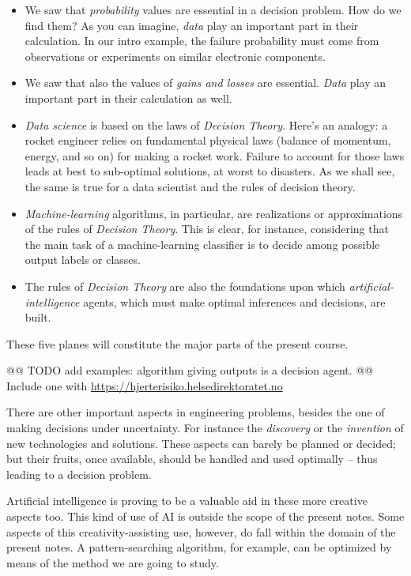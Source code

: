 \documentclass[
  a4paper,
  DIV=11,
  numbers=noendperiod,
  oneside]{scrreprt}
\begin{document}
\begin{itemize}
\item
  We saw that \emph{probability} values are essential in a decision
  problem. How do we find them? As you can imagine, \emph{data} play an
  important part in their calculation. In our intro example, the failure
  probability must come from observations or experiments on similar
  electronic components.
\item
  We saw that also the values of \emph{gains and losses} are essential.
  \emph{Data} play an important part in their calculation as well.
\item
  \emph{Data science} is based on the laws of \emph{Decision Theory}.
  Here's an analogy: a rocket engineer relies on fundamental physical
  laws (balance of momentum, energy, and so on) for making a rocket
  work. Failure to account for those laws leads at best to sub-optimal
  solutions, at worst to disasters. As we shall see, the same is true
  for a data scientist and the rules of decision theory.
\item
  \emph{Machine-learning} algorithms, in particular, are realizations or
  approximations of the rules of \emph{Decision Theory}. This is clear,
  for instance, considering that the main task of a machine-learning
  classifier is to decide among possible output labels or classes.
\item
  The rules of \emph{Decision Theory} are also the foundations upon
  which \emph{artificial-intelligence} agents, which must make optimal
  inferences and decisions, are built.
\end{itemize}

These five planes will constitute the major parts of the present course.

\hfill\break

@@ TODO add examples: algorithm giving outputs is a decision agent. @@
Include one with \url{https://hjerterisiko.helsedirektoratet.no}

There are other important aspects in engineering problems, besides the
one of making decisions under uncertainty. For instance the
\emph{discovery} or the \emph{invention} of new technologies and
solutions. These aspects can barely be planned or decided; but their
fruits, once available, should be handled and used optimally -- thus
leading to a decision problem.

Artificial intelligence is proving to be a valuable aid in these more
creative aspects too. This kind of use of AI is outside the scope of the
present notes. Some aspects of this creativity-assisting use, however,
do fall within the domain of the present notes. A pattern-searching
algorithm, for example, can be optimized by means of the method we are
going to study.
\end{document}
